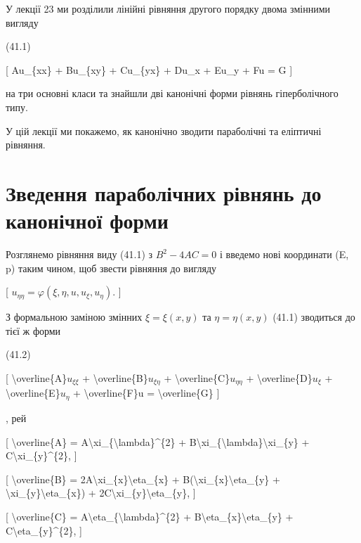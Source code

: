 \documentclass[
]{article}
\begin{document}
{{{У лекції 23 ми розділили лінійні рівняння другого порядку двома змінними
вигляду

(41.1)

{[} Au\_\{xx\} + Bu\_\{xy\} + Cu\_\{yx\} + Du\_x + Eu\_y + Fu = G {]}

на три основні класи та знайшли дві канонічні форми рівнянь
гіперболічного типу.

У цій лекції ми покажемо, як канонічно зводити параболічні та еліптичні
рівняння.

\section{Зведення параболічних рівнянь до канонічної
форми}\label{ux437ux432ux435ux434ux435ux43dux43dux44f-ux43fux430ux440ux430ux431ux43eux43bux456ux447ux43dux438ux445-ux440ux456ux432ux43dux44fux43dux44c-ux434ux43e-ux43aux430ux43dux43eux43dux456ux447ux43dux43eux457-ux444ux43eux440ux43cux438}

Розглянемо рівняння виду (41.1) з \(B^2 - 4AC = 0\) і введемо нові
координати (E, p) таким чином, щоб звести рівняння до вигляду

{[} \(u_{\eta\eta} = \varphi(\xi, \eta, u, u_{\xi}, u_{\eta})\). {]}

З формальною заміною змінних \(\xi = \xi(x, y)\) та
\(\eta = \eta(x, y)\) (41.1) зводиться до тієї ж форми

(41.2)

{[} \textbackslash overline\{A\}\(u_{\xi\xi}\) +
\textbackslash overline\{B\}\(u_{\xi\eta}\) +
\textbackslash overline\{C\}\(u_{\eta\eta}\) +
\textbackslash overline\{D\}\(u_{\xi}\) +
\textbackslash overline\{E\}\(u_{\eta}\) + \textbackslash overline\{F\}u
= \textbackslash overline\{G\} {]}

, рей

{[} \textbackslash overline\{A\} =
A\textbackslash xi\_\{\textbackslash lambda\}\^{}\{2\} +
B\textbackslash xi\_\{\textbackslash lambda\}\textbackslash xi\_\{y\} +
C\textbackslash xi\_\{y\}\^{}\{2\}, {]}

{[} \textbackslash overline\{B\} =
2A\textbackslash xi\_\{x\}\textbackslash eta\_\{x\} +
B(\textbackslash xi\_\{x\}\textbackslash eta\_\{y\} +
\textbackslash xi\_\{y\}\textbackslash eta\_\{x\}) +
2C\textbackslash xi\_\{y\}\textbackslash eta\_\{y\}, {]}

{[} \textbackslash overline\{C\} =
A\textbackslash eta\_\{\textbackslash lambda\}\^{}\{2\} +
B\textbackslash eta\_\{x\}\textbackslash eta\_\{y\} +
C\textbackslash eta\_\{y\}\^{}\{2\}, {]}

}}}
\end{document}

